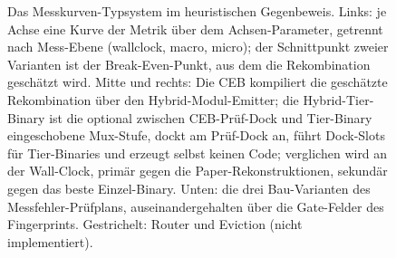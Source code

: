 \begin{nurlang}
\begin{figure}[htbp]
\caption{Das Messkurven-Typsystem im heuristischen Gegenbeweis. Links: je Achse eine Kurve der
Metrik über dem Achsen-Parameter, getrennt nach Mess-Ebene (wallclock, macro, micro); der Schnittpunkt
zweier Varianten ist der Break-Even-Punkt, aus dem die Rekombination geschätzt wird. Mitte und rechts:
Die CEB kompiliert die geschätzte Rekombination über den Hybrid-Modul-Emitter; die Hybrid-Tier-Binary
ist die optional zwischen CEB-Prüf-Dock und Tier-Binary eingeschobene Mux-Stufe, dockt am Prüf-Dock an,
führt Dock-Slots für Tier-Binaries und erzeugt selbst keinen Code; verglichen
wird an der Wall-Clock, primär gegen die Paper-Rekonstruktionen, sekundär gegen das beste
Einzel-Binary. Unten: die drei Bau-Varianten des Messfehler-Prüfplans, auseinandergehalten über die
Gate-Felder des Fingerprints. Gestrichelt: Router und Eviction (nicht
implementiert).}\label{fig:eval-messkurven}
\end{figure}
\end{nurlang}
